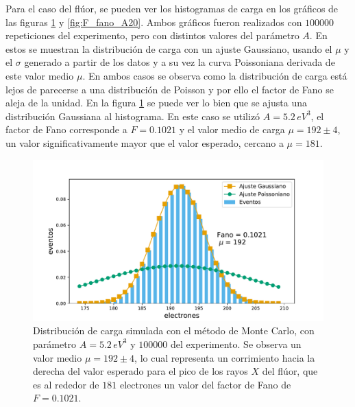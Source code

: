 Para el caso del flúor, se pueden ver los histogramas de carga en los gráficos de las figuras \ref{fig:F_fano_A5.2} y \ref{fig:F_fano_A20}. Ambos gráficos fueron realizados con $100000$ repeticiones del experimento, pero con distintos valores del parámetro $A$. En estos se muestran la distribución de carga con un ajuste Gaussiano, usando el $\mu$ y el $\sigma$ generado a partir de los datos y a su vez la curva Poissoniana derivada de este valor medio $\mu$. En ambos casos se observa como la distribución de carga está lejos de parecerse a una distribución de Poisson y por ello el factor de Fano se aleja de la unidad. En la figura \ref{fig:F_fano_A5.2} se puede ver lo bien que se ajusta una distribución Gaussiana al histograma. En este caso se utilizó $A = 5.2\,\si{eV}^{3}$, el factor de Fano corresponde a $F = 0.1021$ y el valor medio de carga $\mu = 192 \pm 4$, un valor significativamente mayor que el valor esperado, cercano a $\mu = 181$.
\begin{figure}%
    \centering
    \includegraphics[scale=0.5]{Figs/F_Fano_E677_A5.2_Eloss0_100ktrials.pdf}
    \caption{\footnotesize{Distribución de carga simulada con el método de Monte Carlo, con parámetro $A = 5.2\,\si{eV}^{3}$ y $100000$ del experimento. Se observa un valor medio $\mu = 192 \pm 4$, lo cual representa un corrimiento hacia la derecha del valor esperado para el pico de los rayos $X$ del flúor, que es al rededor de $181$ electrones un valor del factor de Fano de $F = 0.1021$.}}
    \label{fig:F_fano_A5.2}
\end{figure}
